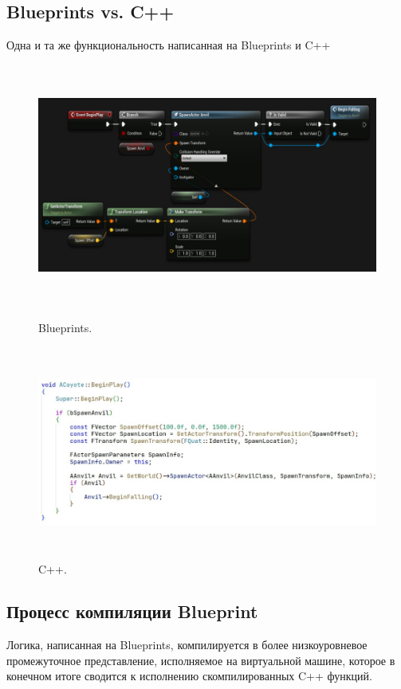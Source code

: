 \subsection{Blueprints vs. C++}
Одна и та же функциональность написанная на Blueprints и C++
\begin{figure}[H]  %
    \centering
    \includegraphics[height=8cm, width=13cm]{blueprints.jpeg}
    \caption{Blueprints.}

    \vspace{0.5cm} %

    \includegraphics[height=7cm, width=13cm]{cpp.jpeg}
    \caption{C++.}
\end{figure}

\subsection{Процесс компиляции Blueprint}

Логика, написанная на Blueprints, компилируется в более низкоуровневое промежуточное представление, исполняемое на виртуальной машине, которое в конечном итоге сводится к исполнению скомпилированных C++ функций.

